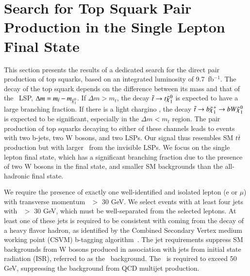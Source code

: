 \section{Search for Top Squark Pair Production in the Single Lepton Final State}
\label{sec:stop}

This section presents the results of a dedicated search for the direct pair production of top squarks, based on an integrated luminosity of 9.7~fb$^{-1}$.
The decay of the top squark depends on the difference between its mass and that of the \lsp\ LSP,
$\Delta m = m_{\tilde{t}}-m_{\tilde{\chi}_{1}^{0}}$. If $\Delta m > m_{t}$, the decay $\tilde{t}\to t\tilde{\chi}_{1}^{0}$ is expected
to have a large branching fraction. If there is a light chargino \chipm, the decay 
$\tilde{t}\to b\tilde{\chi}_{1}^{+}\to b W \tilde{\chi}_{1}^{0}$ is expected to be significant, especially in the $\Delta m < m_{t}$ region.
The pair production of top squarks decaying to either of these channels leads to events with two b-jets, two W bosons,
and two LSPs. Our signal thus resembles SM $t\bar{t}$ production but with larger \met\ from
the invisible LSPs.
We focus on the single lepton final state, which has a significant branching fraction due to the presence of two W bosons
in the final state,
and smaller SM backgrounds than the all-hadronic final state.


We require the presence of exactly one well-identified and isolated lepton (e or $\mu$) with transverse
momentum \pt\ $>$ 30 GeV. 
We select events with at least four jets with \pt\ $>$ 30 GeV,
which must be well-separated from the selected leptons.
At least one of these jets is required to be consistent with coming from the decay of a heavy flavor hadron, as
identified by the Combined Secondary Vertex medium working point (CSVM) b-tagging algorithm~\cite{ref:btag}.
The jet requirements suppress SM backgrounds from W bosons produced in association with jets from initial state
radiation (ISR), referred to as the \wjets\ background. 
The \met\ is required to exceed 50 GeV, suppressing the background from QCD multijet production.


